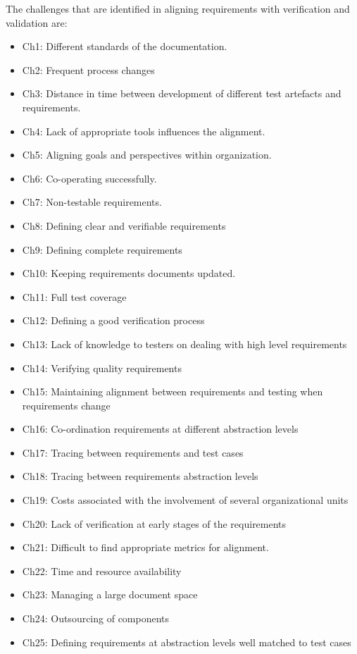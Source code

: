 \documentclass{article}
\begin{document}
The challenges that are identified in aligning requirements with verification and validation are:
\begin{itemize}
    \item  Ch1: Different standards of the documentation.
    \item  Ch2: Frequent process changes
    \item  Ch3: Distance in time between development of different test artefacts and requirements.
    \item Ch4: Lack of appropriate tools influences the alignment.
    \item Ch5: Aligning goals and perspectives within organization.
    \item Ch6: Co-operating successfully.
    \item Ch7: Non-testable requirements.
    \item Ch8: Defining clear and verifiable requirements
    \item Ch9: Defining complete requirements
    \item Ch10: Keeping requirements documents updated.
    \item Ch11: Full test coverage
    \item Ch12: Defining a good verification process
    \item Ch13: Lack of knowledge to testers on dealing with high level requirements
    \item Ch14: Verifying quality requirements
    \item Ch15: Maintaining alignment between requirements and testing when requirements change
    \item Ch16: Co-ordination requirements at different abstraction levels
    \item Ch17: Tracing between requirements and test cases
    \item Ch18: Tracing between requirements abstraction levels
    \item Ch19: Costs associated with the involvement of several organizational units
    \item Ch20: Lack of verification at early stages of the requirements
    \item Ch21: Difficult to find appropriate metrics for alignment.
    \item Ch22: Time and resource availability
    \item Ch23: Managing a large document space
    \item Ch24: Outsourcing of components 
    \item Ch25: Defining requirements at abstraction levels well matched to test cases
\end{itemize}
\end{document}

